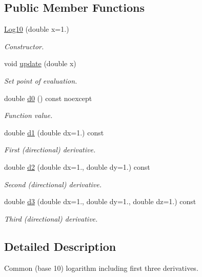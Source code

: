 \subsection*{Public Member Functions}
\begin{DoxyCompactItemize}
\item 
\hyperlink{structFunG_1_1Log10_acfc491f166bfb75b593864849f33fbb0}{Log10} (double x=1.)
\begin{DoxyCompactList}\small\item\em Constructor. \end{DoxyCompactList}\item 
void \hyperlink{structFunG_1_1Log10_a232acaf336d555a2d4b9eefb5dee4272}{update} (double x)
\begin{DoxyCompactList}\small\item\em Set point of evaluation. \end{DoxyCompactList}\item 
double \hyperlink{structFunG_1_1Log10_a0046c146e0a7111ec65acf8ee13c7d85}{d0} () const noexcept
\begin{DoxyCompactList}\small\item\em Function value. \end{DoxyCompactList}\item 
double \hyperlink{structFunG_1_1Log10_aa58c6a61851745d626ada5485331f51c}{d1} (double dx=1.) const 
\begin{DoxyCompactList}\small\item\em First (directional) derivative. \end{DoxyCompactList}\item 
double \hyperlink{structFunG_1_1Log10_a54c3c5131cf317a2188a07a5f56e87c1}{d2} (double dx=1., double dy=1.) const 
\begin{DoxyCompactList}\small\item\em Second (directional) derivative. \end{DoxyCompactList}\item 
double \hyperlink{structFunG_1_1Log10_a385b674f76566344a0188bf8f213b5ec}{d3} (double dx=1., double dy=1., double dz=1.) const 
\begin{DoxyCompactList}\small\item\em Third (directional) derivative. \end{DoxyCompactList}\end{DoxyCompactItemize}


\subsection{Detailed Description}
Common (base 10) logarithm including first three derivatives. 

